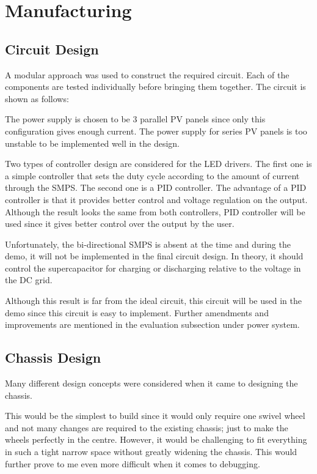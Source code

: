 \section{Manufacturing}
\subsection{Circuit Design}
A modular approach was used to construct the required circuit. Each of the components are tested individually before bringing them together. The circuit is shown as follows:


The power supply is chosen to be 3 parallel PV panels since only this configuration gives enough current. The power supply for series PV panels is too unstable to be implemented well in the design.

Two types of controller design are considered for the LED drivers. The first one is a simple controller that sets the duty cycle according to the amount of current through the SMPS. The second one is a PID controller. The advantage of a PID controller is that it provides better control and voltage regulation on the output. Although the result looks the same from both controllers, PID controller will be used since it gives better control over the output by the user.

Unfortunately, the bi-directional SMPS is absent at the time and during the demo, it will not be implemented in the final circuit design. In theory, it should control the supercapacitor for charging or discharging relative to the voltage in the DC grid.

Although this result is far from the ideal circuit, this circuit will be used in the demo since this circuit is easy to implement. Further amendments and improvements are mentioned in the evaluation subsection under power system.

\subsection{Chassis Design}

Many different design concepts were considered when it came to designing the chassis. 


This would be the simplest to build since it would only require one swivel wheel and not many changes are required to the existing chassis; just to make the wheels perfectly in the centre. However, it would be challenging to fit everything in such a tight narrow space without greatly widening the chassis. This would further prove to me even more difficult when it comes to debugging.

